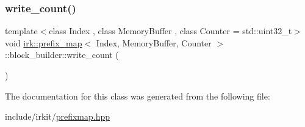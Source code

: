 \subsubsection{\texorpdfstring{write\+\_\+count()}{write\_count()}}
{\footnotesize\ttfamily template$<$class Index , class Memory\+Buffer , class Counter  = std\+::uint32\+\_\+t$>$ \\
void \mbox{\hyperlink{classirk_1_1prefix__map}{irk\+::prefix\+\_\+map}}$<$ Index, Memory\+Buffer, Counter $>$\+::block\+\_\+builder\+::write\+\_\+count (\begin{DoxyParamCaption}{ }\end{DoxyParamCaption})\hspace{0.3cm}{\ttfamily [inline]}}



The documentation for this class was generated from the following file\+:\begin{DoxyCompactItemize}
\item 
include/irkit/\mbox{\hyperlink{prefixmap_8hpp}{prefixmap.\+hpp}}\end{DoxyCompactItemize}
